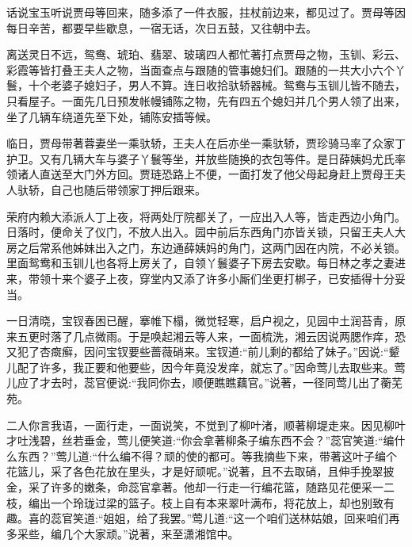 

\begin{parag}
    话说宝玉听说贾母等回来，随多添了一件衣服，拄杖前边来，都见过了。贾母等因每日辛苦，都要早些歇息，一宿无话，次日五鼓，又往朝中去。
\end{parag}


\begin{parag}
    离送灵日不远，鸳鸯、琥珀、翡翠、玻璃四人都忙著打点贾母之物，玉钏、彩云、彩霞等皆打叠王夫人之物，当面查点与跟随的管事媳妇们。跟随的一共大小六个丫鬟，十个老婆子媳妇子，男人不算。连日收拾驮轿器械。鸳鸯与玉钏儿皆不随去，只看屋子。一面先几日预发帐幔铺陈之物，先有四五个媳妇并几个男人领了出来，坐了几辆车绕道先至下处，铺陈安插等候。
\end{parag}


\begin{parag}
    临日，贾母带著蓉妻坐一乘驮轿，王夫人在后亦坐一乘驮轿，贾珍骑马率了众家丁护卫。又有几辆大车与婆子丫鬟等坐，并放些随换的衣包等件。是日薛姨妈尤氏率领诸人直送至大门外方回。贾琏恐路上不便，一面打发了他父母起身赶上贾母王夫人驮轿，自己也随后带领家丁押后跟来。
\end{parag}


\begin{parag}
    荣府内赖大添派人丁上夜，将两处厅院都关了，一应出入人等，皆走西边小角门。日落时，便命关了仪门，不放人出入。园中前后东西角门亦皆关锁，只留王夫人大房之后常系他姊妹出入之门，东边通薛姨妈的角门，这两门因在内院，不必关锁。里面鸳鸯和玉钏儿也各将上房关了，自领丫鬟婆子下房去安歇。每日林之孝之妻进来，带领十来个婆子上夜，穿堂内又添了许多小厮们坐更打梆子，已安插得十分妥当。
\end{parag}


\begin{parag}
    一日清晓，宝钗春困已醒，搴帷下榻，微觉轻寒，启户视之，见园中土润苔青，原来五更时落了几点微雨。于是唤起湘云等人来，一面梳洗，湘云因说两腮作痒，恐又犯了杏癍癣，因问宝钗要些蔷薇硝来。宝钗道:“前儿剩的都给了妹子。”因说:“颦儿配了许多，我正要和他要些，因今年竟没发痒，就忘了。”因命莺儿去取些来。莺儿应了才去时，蕊官便说:“我同你去，顺便瞧瞧藕官。”说著，一径同莺儿出了蘅芜苑。
\end{parag}


\begin{parag}
    二人你言我语，一面行走，一面说笑，不觉到了柳叶渚，顺著柳堤走来。因见柳叶才吐浅碧，丝若垂金，莺儿便笑道:“你会拿著柳条子编东西不会？”蕊官笑道:“编什么东西？”莺儿道:“什么编不得？顽的使的都可。等我摘些下来，带著这叶子编个花篮儿，采了各色花放在里头，才是好顽呢。”说著，且不去取硝，且伸手挽翠披金，采了许多的嫩条，命蕊官拿著。他却一行走一行编花篮，随路见花便采一二枝，编出一个玲珑过梁的篮子。枝上自有本来翠叶满布，将花放上，却也别致有趣。喜的蕊官笑道:“姐姐，给了我罢。”莺儿道:“这一个咱们送林姑娘，回来咱们再多采些，编几个大家顽。”说著，来至潇湘馆中。
\end{parag}


